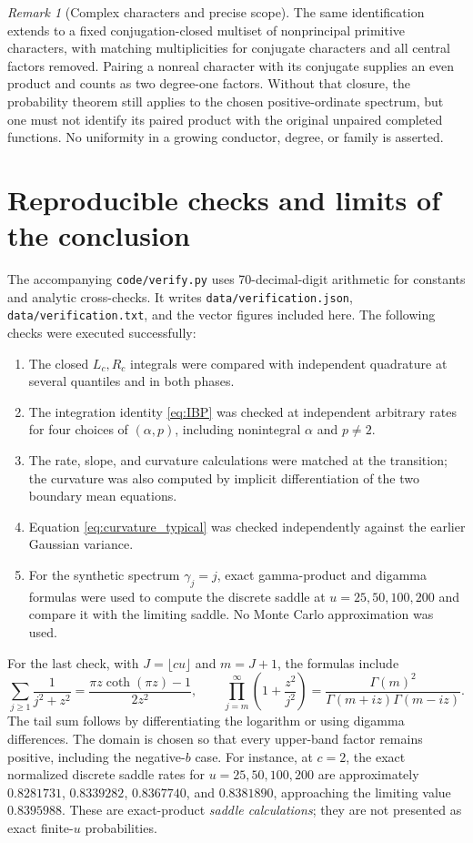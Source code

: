 \documentclass[11pt,letterpaper]{article}
\numberwithin{equation}{section}
\theoremstyle{definition}
\theoremstyle{remark}
\newtheorem{remark}[theorem]{Remark}
\begin{document}
\begin{remark}[Complex characters and precise scope]
The same identification extends to a fixed conjugation-closed multiset of nonprincipal primitive characters, with matching multiplicities for conjugate characters and all central factors removed. Pairing a nonreal character with its conjugate supplies an even product and counts as two degree-one factors. Without that closure, the probability theorem still applies to the chosen positive-ordinate spectrum, but one must not identify its paired product with the original unpaired completed functions. No uniformity in a growing conductor, degree, or family is asserted.
\end{remark}

\section{Reproducible checks and limits of the conclusion}\label{sec:verification}

The accompanying \texttt{code/verify.py} uses 70-decimal-digit arithmetic for constants and analytic cross-checks. It writes \texttt{data/verification.json}, \texttt{data/verification.txt}, and the vector figures included here. The following checks were executed successfully:
\begin{enumerate}
 \item The closed $L_c,R_c$ integrals were compared with independent quadrature at several quantiles and in both phases.
 \item The integration identity \cref{eq:IBP} was checked at independent arbitrary rates for four choices of $(\alpha,p)$, including nonintegral $\alpha$ and $p\ne2$.
 \item The rate, slope, and curvature calculations were matched at the transition; the curvature was also computed by implicit differentiation of the two boundary mean equations.
 \item Equation \cref{eq:curvature_typical} was checked independently against the earlier Gaussian variance.
 \item For the synthetic spectrum $\gamma_j=j$, exact gamma-product and digamma formulas were used to compute the discrete saddle at $u=25,50,100,200$ and compare it with the limiting saddle. No Monte Carlo approximation was used.
\end{enumerate}

For the last check, with $J=\lfloor cu\rfloor$ and $m=J+1$, the formulas include
\[
 \sum_{j\ge1}\frac1{j^2+z^2}
 =\frac{\pi z\coth(\pi z)-1}{2z^2},\qquad
 \prod_{j=m}^\infty\left(1+\frac{z^2}{j^2}\right)
 =\frac{\Gamma(m)^2}{\Gamma(m+iz)\Gamma(m-iz)}.
\]
The tail sum follows by differentiating the logarithm or using digamma differences. The domain is chosen so that every upper-band factor remains positive, including the negative-$b$ case. For instance, at $c=2$, the exact normalized discrete saddle rates for $u=25,50,100,200$ are approximately $0.8281731$, $0.8339282$, $0.8367740$, and $0.8381890$, approaching the limiting value $0.8395988$. These are exact-product \emph{saddle calculations}; they are not presented as exact finite-$u$ probabilities.
\end{document}
